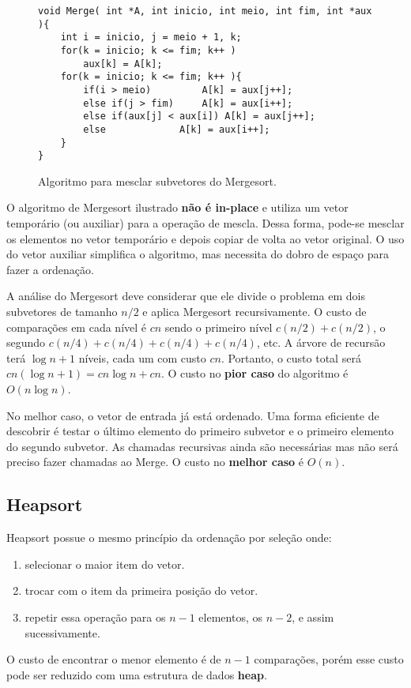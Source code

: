 \begin{figure}[!htb]
\centering
\begin{framed}
\begin{lstlisting}
void Merge( int *A, int inicio, int meio, int fim, int *aux ){
	int i = inicio, j = meio + 1, k;
	for(k = inicio; k <= fim; k++ )
		aux[k] = A[k];
	for(k = inicio; k <= fim; k++ ){
		if(i > meio)		 A[k] = aux[j++];
		else if(j > fim)	 A[k] = aux[i++];
		else if(aux[j] < aux[i]) A[k] = aux[j++];
		else 			 A[k] = aux[i++];
	}
}
\end{lstlisting}
\end{framed}
\caption{Algoritmo para mesclar subvetores do Mergesort.}
\label{aula03:algo:merge}
\end{figure}

O algoritmo de Mergesort ilustrado {\bf não é in-place} e utiliza um vetor
temporário (ou auxiliar) para a operação de mescla.
Dessa forma, pode-se mesclar os elementos no vetor temporário e depois copiar
de volta ao vetor original.
O uso do vetor auxiliar simplifica o algoritmo, mas necessita do dobro de
espaço para fazer a ordenação.

A análise do Mergesort deve considerar que ele divide o problema em dois
subvetores de tamanho $n/2$ e aplica Mergesort recursivamente.
O custo de comparações em cada nível é $cn$ sendo o primeiro nível
$c(n/2)+c(n/2)$, o segundo $c(n/4)+c(n/4)+c(n/4)+c(n/4)$, etc.
A árvore de recursão terá $\log n + 1$ níveis, cada um com custo $cn$.
Portanto, o custo total será $cn(\log n + 1) = cn \log n + cn$.
O custo no {\bf pior caso} do algoritmo é $O(n \log n)$.

No melhor caso, o vetor de entrada já está ordenado. 
Uma forma eficiente de descobrir é testar o último elemento do primeiro subvetor
e o primeiro elemento do segundo subvetor.
As chamadas recursivas ainda são necessárias mas não será preciso fazer chamadas
ao Merge.
O custo no {\bf melhor caso} é $O(n)$.

\subsection{Heapsort}

Heapsort possue o mesmo princípio da ordenação por seleção onde:
\begin{enumerate}
\item selecionar o maior item do vetor.
\item trocar com o item da primeira posição do vetor.
\item repetir essa operação para os $n-1$ elementos, os $n-2$, e assim sucessivamente.
\end{enumerate}
O custo de encontrar o menor elemento é de $n-1$ comparações, porém esse custo pode ser reduzido
com uma estrutura de dados {\bf heap}.

